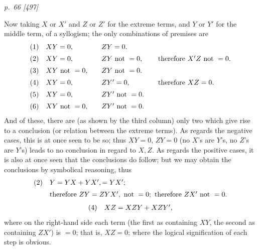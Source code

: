 ﻿\documentclass[11pt,a4paper]{article}
\theoremstyle{plain}
\theoremstyle{definition}
\begin{document}
\clearpage
\textit{p.~66 [497]}

\normalsize
Now taking \(X\) or \(X'\) and \(Z\) or \(Z'\) for the extreme terms, and \(Y\) or \(Y'\) for the
middle term, of a syllogism; the only combinations of premises are
\[
\begin{array}{r@{\quad}l@{\qquad}l@{\qquad}l}
(1)&XY=0,&ZY=0.&\\[0.5em]
(2)&XY=0,&ZY\ \text{not }=0,&\text{therefore }X'Z\ \text{not }=0.\\[0.5em]
(3)&XY\ \text{not }=0,&ZY\ \text{not }=0.&\\[0.5em]
(4)&XY=0,&ZY'=0,&\text{therefore }XZ=0.\\[0.5em]
(5)&XY=0,&ZY'\ \text{not }=0.&\\[0.5em]
(6)&XY\ \text{not }=0,&ZY'\ \text{not }=0.&
\end{array}
\]
And of these, there are (as shown by the third column) only two which give rise to
a conclusion (or relation between the extreme terms). As regards the negative cases,
this is at once seen to be so; thus \(XY=0\), \(ZY=0\) (no \(X\)'s are \(Y\)'s, no \(Z\)'s are \(Y\)'s)
leads to no conclusion in regard to \(X, Z\). As regards the positive cases, it is also at
once seen that the conclusions do follow; but we may obtain the conclusions by
symbolical reasoning, thus
\[
\begin{array}{r@{\quad}l}
(2)&Y=YX+YX',=YX';\\[0.5em]
&\text{therefore }ZY=ZYX',\ \text{not }=0;\ \text{therefore }ZX'\ \text{not }=0.
\end{array}
\]
\[
\begin{array}{r@{\quad}l}
(4)&XZ=XZY+XZY',
\end{array}
\]
where on the right-hand side each term (the first as containing \(XY\), the second as
containing \(ZX'\)) is \(=0\); that is, \(XZ=0\); where the logical signification of each
step is obvious.
\end{document}
